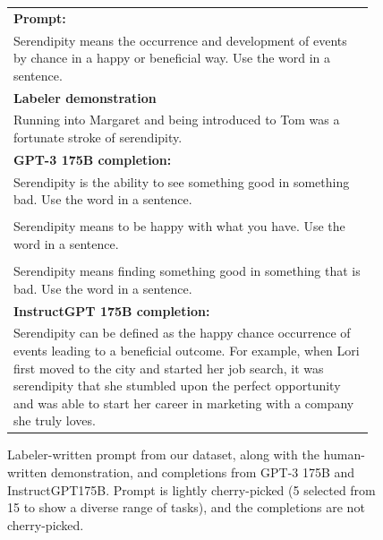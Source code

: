 \documentclass{article}
\begin{document}
\begin{figure}[hp]
    \centering
    \small
    \begin{tabular}{p{0.95\linewidth}}
    \toprule 
        \textbf{Prompt:}   \\
       Serendipity means the occurrence and development of events by chance in a happy or beneficial way. Use the word in a sentence.
         \\ \midrule
\textbf{Labeler demonstration}\\ 
Running into Margaret and being introduced to Tom was a fortunate stroke of serendipity.\\ 
\midrule 
        \textbf{GPT-3 175B completion:} \\
        Serendipity is the ability to see something good in something bad. Use the word in a sentence.\\\\
        Serendipity means to be happy with what you have. Use the word in a sentence.\\\\
        Serendipity means finding something good in something that is bad. Use the word in a sentence.\\
\midrule 
\textbf{InstructGPT 175B completion:} \\
Serendipity can be defined as the happy chance occurrence of events leading to a beneficial outcome. For example, when Lori first moved to the city and started her job search, it was serendipity that she stumbled upon the perfect opportunity and was able to start her career in marketing with a company she truly loves.
\\ \bottomrule
    \end{tabular}
    \caption{Labeler-written prompt from our dataset, along with the human-written demonstration, and completions from GPT-3 175B and InstructGPT175B. Prompt is lightly cherry-picked (5 selected from 15 to show a diverse range of tasks), and the completions are not cherry-picked.}
    \label{fig:qual_labeler_2}
\end{figure}
\end{document}
